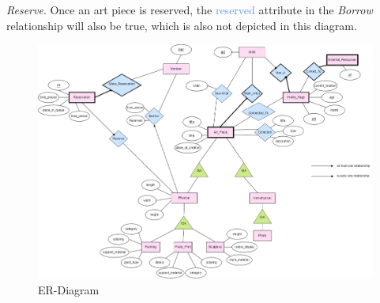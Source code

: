 \documentclass[11pt]{article}
\begin{document}
\textit{Reserve}. Once an art piece is reserved, the \textcolor{CornflowerBlue}{reserved} attribute in the \textit{Borrow} relationship will also be true, which is also not depicted in this diagram.

\begin{center}
\begin{figure}[H]
    \caption{ER-Diagram}
    \includegraphics[width=18cm]{ER_Diagram.png}
\end{figure}
\end{center}
\end{document}
